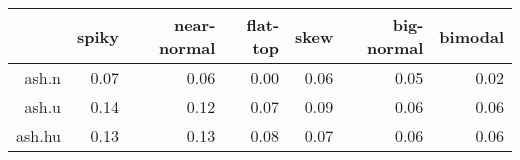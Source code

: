 \begin{tabular}{rrrrrrr}
  \toprule  & spiky & near-normal & flat-top & skew & big-normal & bimodal \\ 
  \midrule ash.n & 0.07 & 0.06 & 0.00 & 0.06 & 0.05 & 0.02 \\ 
  ash.u & 0.14 & 0.12 & 0.07 & 0.09 & 0.06 & 0.06 \\ 
  ash.hu & 0.13 & 0.13 & 0.08 & 0.07 & 0.06 & 0.06 \\ 
   \bottomrule \end{tabular}

